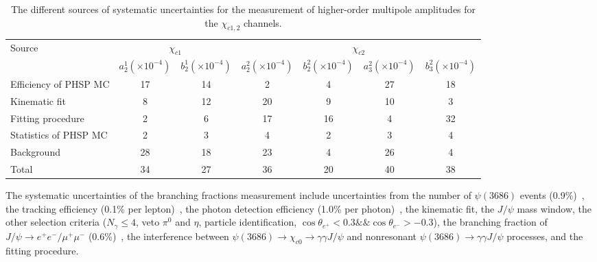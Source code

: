 \documentclass[prd,twocolumn,showpacs,amsmath,amssymb]{revtex4-1}
\begin{document}
\begin{table*}[!htbp]
\centering
\caption{\label{chicJ_sys}The different sources of systematic uncertainties for the measurement of higher-order multipole amplitudes
for the $\chi_{c1,2}$ channels.}
\begin{tabular}{l|cc|cc|cc}
\hline
    \multirow{2}{*}{Source}    &   \multicolumn{2}{c|}{$\chi_{c1}$} & \multicolumn{4}{c}{$\chi_{c2}$}\\
\cline{2-7}
                               & $a_2^{1}(\times10^{-4})$& $b_2^{1}(\times10^{-4})$& $a_2^{2}(\times10^{-4})$   &     $b_2^{2}(\times10^{-4})$    & $a_3^{2}(\times10^{-4})$  & $b_3^{2}(\times10^{-4})$         \\
\hline
  Efficiency of {\sc PHSP} MC  & 17& 14 &  2  &    4    &  27   &   18         \\
  Kinematic fit                & 8 & 12 &  20 &    9    &  10   &   3          \\
  Fitting procedure            & 2 & 6  &  17 &    16   &  4    &   32         \\
  Statistics of {\sc PHSP} MC  & 2 & 3  &  4  &    2    &  3    &   4          \\
  Background                   & 28& 18 &  23 &    4    &  26   &   4          \\
\hline
  Total                        & 34& 27 &  36 &    20   &   40  &   38         \\
\hline
\end{tabular}
\end{table*}

The systematic uncertainties of the branching fractions measurement include uncertainties from the number of $\psi(3686)$ events (0.9\%)~\cite{psip_N}, the tracking efficiency (0.1\% per lepton)~\cite{sys_tracking}, the
photon detection efficiency (1.0\% per photon)~\cite{sys_photon},
the kinematic fit, the $J/\psi$ mass window, the other selection criteria ($N_{\gamma} \leq 4$, veto $\pi^{0}$ and $\eta$, particle identification, $\cos\theta_{e^+}<0.3 \&\& \cos\theta_{e^-}>-0.3$), the
branching fraction of $J/\psi \rightarrow e^{+}e^{-}/ \mu^{+}\mu^{-}$ (0.6\%)~\cite{PDG}, the interference between $\psi(3686)\to\chi_{c0}\to\gamma\gamma J/\psi$ and nonresonant $\psi(3686)\to\gamma\gamma J/\psi$ processes, and the fitting procedure.
\end{document}
